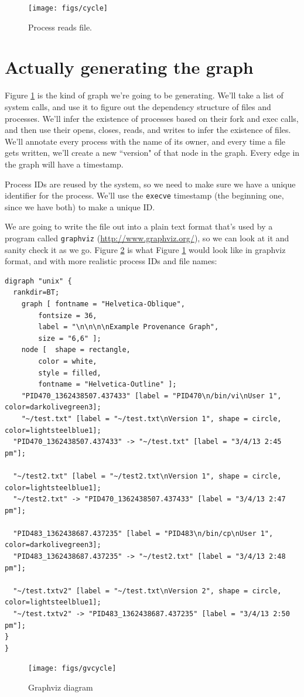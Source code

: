 \documentclass{article}
\begin{document}
\begin{figure}[h!]
  \centering
    \texttt{[image: figs/cycle]}
      \caption{Process reads file.}
      \label{fig:cycle}
\end{figure}

\section{Actually generating the graph}
Figure \ref{fig:cycle} is the kind of graph we're going to be generating.  We'll take a list of system calls, and use it to figure out the dependency structure of files and processes. We'll infer the existence of processes based on their fork and exec calls, and then use their opens, closes, reads, and writes to infer the existence of files.  We'll annotate every process with the name of its owner, and every time a file gets written, we'll create a new ``version" of that node in the graph.  Every edge in the graph will have a timestamp.

Process IDs are reused by the system, so we need to make sure we have a unique identifier for the process.  We'll use the \texttt{execve} timestamp (the beginning one, since we have both) to make a unique ID.

We are going to write the file out into a plain text format that's used by a program called \texttt{graphviz} (\url{http://www.graphviz.org/}), so we can look at it and sanity check it as we go.  Figure \ref{fig:gvcycle} is what Figure \ref{fig:cycle} would look like in graphviz format, and with more realistic process IDs and file names: 

\begin{verbatim}
digraph "unix" {
  rankdir=BT;
	graph [	fontname = "Helvetica-Oblique",
		fontsize = 36,
		label = "\n\n\n\nExample Provenance Graph",
		size = "6,6" ];
	node [	shape = rectangle,
		color = white,
		style = filled,
		fontname = "Helvetica-Outline" ];
	"PID470_1362438507.437433" [label = "PID470\n/bin/vi\nUser 1", color=darkolivegreen3];
	"~/test.txt" [label = "~/test.txt\nVersion 1", shape = circle, color=lightsteelblue1];
  "PID470_1362438507.437433" -> "~/test.txt" [label = "3/4/13 2:45 pm"];
  
  "~/test2.txt" [label = "~/test2.txt\nVersion 1", shape = circle, color=lightsteelblue1];
  "~/test2.txt" -> "PID470_1362438507.437433" [label = "3/4/13 2:47 pm"];
  
  "PID483_1362438687.437235" [label = "PID483\n/bin/cp\nUser 1", color=darkolivegreen3];
  "PID483_1362438687.437235" -> "~/test2.txt" [label = "3/4/13 2:48 pm"];
  
  "~/test.txtv2" [label = "~/test.txt\nVersion 2", shape = circle, color=lightsteelblue1];
  "~/test.txtv2" -> "PID483_1362438687.437235" [label = "3/4/13 2:50 pm"];
}
}
\end{verbatim}

\begin{figure}[h!]
  \centering
    \texttt{[image: figs/gvcycle]}
      \caption{Graphviz diagram}
      \label{fig:gvcycle}
\end{figure}
\end{document}
